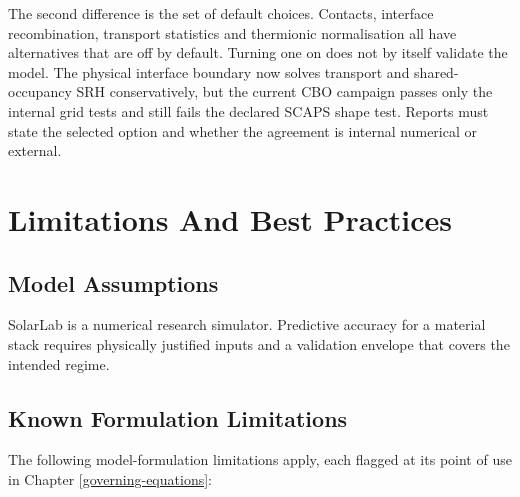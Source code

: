 \documentclass[
  11pt,
  american,
]{report}
\begin{document}
The second difference is the set of default choices. Contacts, interface
recombination, transport statistics and thermionic normalisation all
have alternatives that are off by default. Turning one on does not by
itself validate the model. The physical interface boundary now solves
transport and shared-occupancy SRH conservatively, but the current CBO
campaign passes only the internal grid tests and still fails the
declared SCAPS shape test. Reports must state the selected option and
whether the agreement is internal numerical or external.

\hypertarget{limitations-and-best-practices}{%
\chapter{Limitations And Best
Practices}\label{limitations-and-best-practices}}

\hypertarget{model-assumptions}{%
\section{Model Assumptions}\label{model-assumptions}}

SolarLab is a numerical research simulator. Predictive accuracy for a
material stack requires physically justified inputs and a validation
envelope that covers the intended regime.

\hypertarget{known-formulation-limitations}{%
\section{Known Formulation
Limitations}\label{known-formulation-limitations}}

The following model-formulation limitations apply, each flagged at its
point of use in Chapter \ref{governing-equations}:
\end{document}

